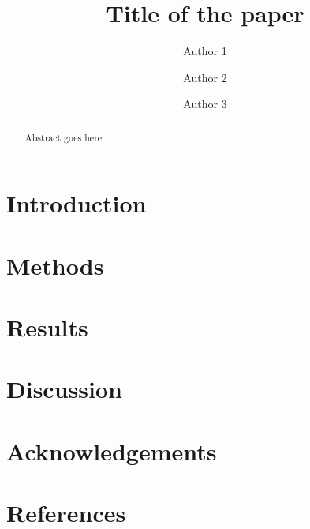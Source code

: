 \documentclass[12pt]{article}
\begin{document}
\title{Title of the paper}
\author[1]{Author 1}
\author[2]{Author 2}
\author[3]{Author 3}

\maketitle

\begin{abstract}
Abstract goes here

\end{abstract}

\section{Introduction}

\section{Methods}

\section{Results}

\section{Discussion}

\section{Acknowledgements}

\section{References}
\end{document}
